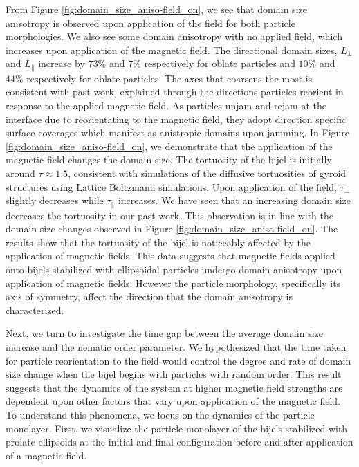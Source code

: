 From Figure \ref{fig:domain_size_aniso-field_on}, we see that domain
size anisotropy is observed upon application of the field for both
particle morphologies. We also see some domain anisotropy with no
applied field, which increases upon application of the magnetic field.
The directional domain sizes, \(L_{\perp}\) and \(L_{\parallel}\)
increase by \(73\%\) and \(7\%\) respectively for oblate particles and
\(10\%\) and \(44\%\) respectively for oblate particles. The axes that
coarsens the most is consistent with past work, explained through the
directions particles reorient in response to the applied magnetic field.
As particles unjam and rejam at the interface due to reorientating to
the magnetic field, they adopt direction specific surface coverages
which manifest as anistropic domains upon jamming. In Figure
\ref{fig:domain_size_aniso-field_on}, we demonstrate that the
application of the magnetic field changes the domain size. The
tortuosity of the bijel is initially around \(\tau \approx 1.5\),
consistent with simulations of the diffusive tortuosities of gyroid
structures using Lattice Boltzmann simulations.
\cite{luo_macroscopic_2020} Upon application of the field,
\(\tau_{\perp}\) slightly decreases while \(\tau_{\parallel}\)
increases. We have seen that an increasing domain size decreases the
tortuosity in our past work. \cite{karthikeyan_formation_2024} This
observation is in line with the domain size changes observed in Figure
\ref{fig:domain_size_aniso-field_on}. The results show that the
tortuosity of the bijel is noticeably affected by the application of
magnetic fields. This data suggests that magnetic fields applied onto
bijels stabilized with ellipsoidal particles undergo domain anisotropy
upon application of magnetic fields. However the particle morphology,
specifically its axis of symmetry, affect the direction that the domain
anisotropy is characterized.

Next, we turn to investigate the time gap between the average domain
size increase and the nematic order parameter. We hypothesized that the
time taken for particle reorientation to the field would control the
degree and rate of domain size change when the bijel begins with
particles with random order. This result suggests that the dynamics of
the system at higher magnetic field strengths are dependent upon other
factors that vary upon application of the magnetic field. To understand
this phenomena, we focus on the dynamics of the particle monolayer.
First, we visualize the particle monolayer of the bijels stabilized with
prolate ellipsoids at the initial and final configuration before and
after application of a magnetic field.

